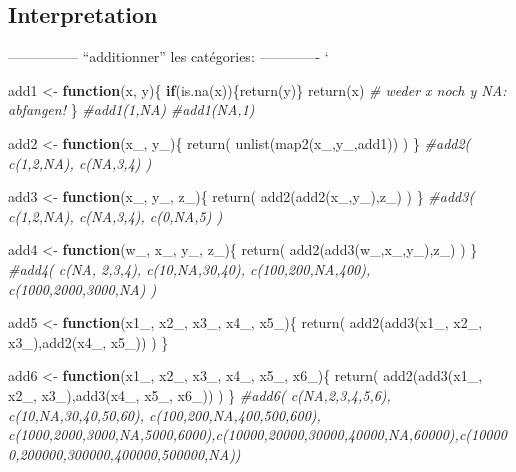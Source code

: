 \documentclass[
]{article}
\newenvironment{Shaded}{\begin{snugshade}}{\end{snugshade}}
\newcommand{\CommentTok}[1]{\textcolor[rgb]{0.56,0.35,0.01}{\textit{#1}}}
\newcommand{\ControlFlowTok}[1]{\textcolor[rgb]{0.13,0.29,0.53}{\textbf{#1}}}
\newcommand{\FunctionTok}[1]{\textcolor[rgb]{0.00,0.00,0.00}{#1}}
\newcommand{\NormalTok}[1]{#1}
\newcommand{\OtherTok}[1]{\textcolor[rgb]{0.56,0.35,0.01}{#1}}
\begin{document}
\hypertarget{interpretation}{%
\subsection{Interpretation}\label{interpretation}}

--------------- ``additionner'' les catégories: ------------- `

\begin{Shaded}
\begin{Highlighting}[]
\NormalTok{add1 }\OtherTok{\textless{}{-}} \ControlFlowTok{function}\NormalTok{(x, y)\{}
  \ControlFlowTok{if}\NormalTok{(}\FunctionTok{is.na}\NormalTok{(x))\{}\FunctionTok{return}\NormalTok{(y)\}}
  \FunctionTok{return}\NormalTok{(x)                 }\CommentTok{\# weder x noch y NA: abfangen!}
\NormalTok{\}}
\CommentTok{\#add1(1,NA)}
\CommentTok{\#add1(NA,1)}

\NormalTok{add2 }\OtherTok{\textless{}{-}} \ControlFlowTok{function}\NormalTok{(x\_, y\_)\{}
  \FunctionTok{return}\NormalTok{( }\FunctionTok{unlist}\NormalTok{(}\FunctionTok{map2}\NormalTok{(x\_,y\_,add1)) )}
\NormalTok{\}}
\CommentTok{\#add2( c(1,2,NA), c(NA,3,4) )}

\NormalTok{add3 }\OtherTok{\textless{}{-}} \ControlFlowTok{function}\NormalTok{(x\_, y\_, z\_)\{}
  \FunctionTok{return}\NormalTok{( }\FunctionTok{add2}\NormalTok{(}\FunctionTok{add2}\NormalTok{(x\_,y\_),z\_) )}
\NormalTok{\}}
\CommentTok{\#add3( c(1,2,NA), c(NA,3,4), c(0,NA,5) )}

\NormalTok{add4 }\OtherTok{\textless{}{-}} \ControlFlowTok{function}\NormalTok{(w\_, x\_, y\_, z\_)\{}
  \FunctionTok{return}\NormalTok{( }\FunctionTok{add2}\NormalTok{(}\FunctionTok{add3}\NormalTok{(w\_,x\_,y\_),z\_) )}
\NormalTok{\}}
\CommentTok{\#add4( c(NA, 2,3,4), c(10,NA,30,40), c(100,200,NA,400), c(1000,2000,3000,NA) )}

\NormalTok{add5 }\OtherTok{\textless{}{-}} \ControlFlowTok{function}\NormalTok{(x1\_, x2\_, x3\_, x4\_, x5\_)\{}
  \FunctionTok{return}\NormalTok{( }\FunctionTok{add2}\NormalTok{(}\FunctionTok{add3}\NormalTok{(x1\_, x2\_, x3\_),}\FunctionTok{add2}\NormalTok{(x4\_, x5\_)) )}
\NormalTok{\}}

\NormalTok{add6 }\OtherTok{\textless{}{-}} \ControlFlowTok{function}\NormalTok{(x1\_, x2\_, x3\_, x4\_, x5\_, x6\_)\{}
  \FunctionTok{return}\NormalTok{( }\FunctionTok{add2}\NormalTok{(}\FunctionTok{add3}\NormalTok{(x1\_, x2\_, x3\_),}\FunctionTok{add3}\NormalTok{(x4\_, x5\_, x6\_)) )}
\NormalTok{\}}
\CommentTok{\#add6( c(NA,2,3,4,5,6), c(10,NA,30,40,50,60), c(100,200,NA,400,500,600), c(1000,2000,3000,NA,5000,6000),c(10000,20000,30000,40000,NA,60000),c(100000,200000,300000,400000,500000,NA))}


\end{Highlighting}
\end{Shaded}
\end{document}
